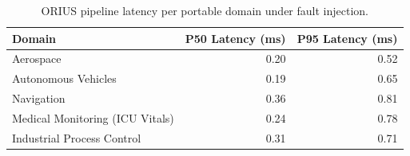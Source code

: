 \begin{table}[htbp]
\centering
\caption{ORIUS pipeline latency per portable domain under fault injection.}
\label{tab:all_domain_latency}
\begin{tabular}{lrr}
\toprule
Domain & P50 Latency (ms) & P95 Latency (ms) \\
\midrule
Aerospace & 0.20 & 0.52 \\
Autonomous Vehicles & 0.19 & 0.65 \\
Navigation & 0.36 & 0.81 \\
Medical Monitoring (ICU Vitals) & 0.24 & 0.78 \\
Industrial Process Control & 0.31 & 0.71 \\
\bottomrule
\end{tabular}
\end{table}